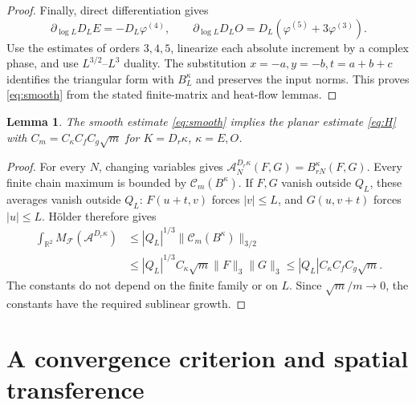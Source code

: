 \documentclass[11pt,a4paper]{article}
\newtheorem{lemma}[theorem]{Lemma}
\theoremstyle{definition}
\newenvironment{statementframe}
  {\par\addvspace{4pt}\noindent
   \setlength{\fboxsep}{6pt}\setlength{\fboxrule}{0.45pt}%
   \begin{lrbox}{\statementbox}%
   \begin{minipage}{\dimexpr\linewidth-2\fboxsep-2\fboxrule\relax}}
  {\end{minipage}\end{lrbox}%
   \fbox{\usebox{\statementbox}}\par\addvspace{4pt}}
\newcommand{\R}{\mathbb R}
\newcommand{\1}{\mathbf1}
\newcommand{\A}{\mathcal A}
\newcommand{\F}{\mathcal F}
\begin{document}
\begin{proof}
Finally, direct differentiation gives
\[
 \partial_{\log L}D_LE=-D_L\varphi^{(4)},\qquad
 \partial_{\log L}D_LO=D_L(\varphi^{(5)}+3\varphi^{(3)}).
\]
Use the estimates of orders $3,4,5$, linearize each absolute increment
by a complex phase, and use $L^{3/2}$--$L^3$ duality. The substitution
$x=-a,y=-b,t=a+b+c$ identifies the triangular form with $B_L^\kappa$
and preserves the input norms. This proves \eqref{eq:smooth} from the
stated finite-matrix and heat-flow lemmas.
\end{proof}

\begin{statementframe}
\begin{lemma}\label{lem:smooth-to-H}
The smooth estimate \eqref{eq:smooth} implies the planar estimate
\eqref{eq:H} with $C_m=C_\kappa C_fC_g\sqrt m$ for
$K=D_r\kappa$, $\kappa=E,O$.
\end{lemma}
\end{statementframe}
\begin{proof}
For every $N$, changing variables gives
$\A_N^{D_r\kappa}(F,G)=B_{rN}^\kappa(F,G)$.
Every finite chain maximum is bounded by $\mathcal C_m(B^\kappa)$.
If $F,G$ vanish outside $Q_L$, these averages vanish outside $Q_L$:
$F(u+t,v)$ forces $|v|\le L$, and $G(u,v+t)$ forces $|u|\le L$.
H\"older therefore gives
\begin{align*}
 \int_{\R^2}M_\F(\A^{D_r\kappa})
 &\le |Q_L|^{1/3}\|\mathcal C_m(B^\kappa)\|_{3/2}\\
 &\le |Q_L|^{1/3}C_\kappa\sqrt m\|F\|_3\|G\|_3
 \le |Q_L|C_\kappa C_fC_g\sqrt m.
\end{align*}
The constants do not depend on the finite family or on $L$.
Since $\sqrt m/m\to0$, the constants have the required sublinear growth.
\end{proof}

\section{A convergence criterion and spatial transference}
\end{document}
